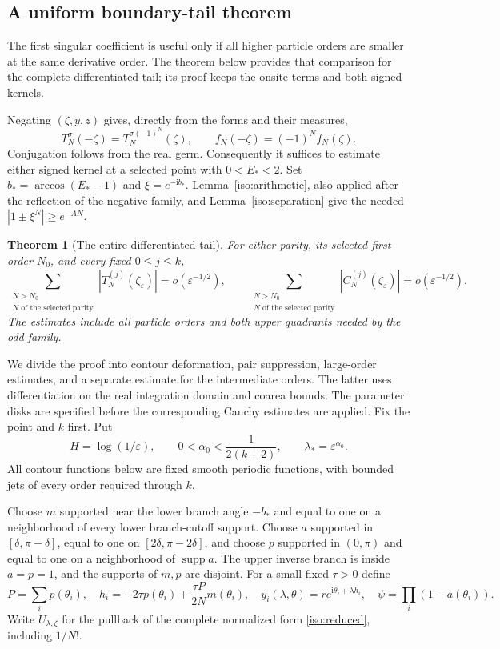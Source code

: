 \documentclass[11pt]{article}
\numberwithin{equation}{section}
\newtheorem{theorem}{Theorem}[section]
\theoremstyle{definition}
\newcommand{\ii}{\mathrm i}
\newcommand{\eps}{\varepsilon}
\begin{document}
\subsection{A uniform boundary-tail theorem}

The first singular coefficient is useful only if all higher particle
orders are smaller at the same derivative order. The theorem below
provides that comparison for the complete differentiated tail; its
proof keeps the onsite terms and both signed kernels.

Negating $(\zeta,y,z)$ gives, directly from the forms and their measures,
\begin{equation}
 T_N^\sigma(-\zeta)=T_N^{\sigma(-1)^N}(\zeta),\qquad
 f_N(-\zeta)=(-1)^Nf_N(\zeta).
 \label{iso:sign}
\end{equation}
Conjugation follows from the real germ. Consequently it suffices to
estimate either signed kernel at a selected point with $0<E_*<2$.
Set $b_*=\arccos(E_*-1)$ and $\xi=e^{-\ii b_*}$.
Lemma~\ref{iso:arithmetic}, also applied after the reflection of the
negative family, and Lemma~\ref{iso:separation} give the needed
$|1\pm\xi^N|\ge e^{-AN}$.

\begin{theorem}[The entire differentiated tail]\label{iso:tail}
For either parity, its selected first order $N_0$, and every fixed
$0\le j\le k$,
\[
 \sum_{\substack{N>N_0\\N\text{ of the selected parity}}}
 |T_N^{(j)}(\zeta_\eps)|=o(\eps^{-1/2}),\qquad
 \sum_{\substack{N>N_0\\N\text{ of the selected parity}}}
 |C_N^{(j)}(\zeta_\eps)|=o(\eps^{-1/2}).
\]
The estimates include all particle orders and both upper quadrants
needed by the odd family.
\end{theorem}

We divide the proof into contour deformation, pair suppression,
large-order estimates, and a separate estimate for the intermediate
orders. The latter uses differentiation on the real integration
domain and coarea bounds. The parameter disks are specified before
the corresponding Cauchy estimates are applied.
Fix the point and $k$ first. Put
\[
 H=\log(1/\eps),\qquad 0<\alpha_0<\frac1{2(k+2)},\qquad
 \lambda_*=\eps^{\alpha_0}.
\]
All contour functions below are fixed smooth periodic functions, with
bounded jets of every order required through $k$.

Choose $m$ supported near the lower branch angle $-b_*$ and equal to one
on a neighborhood of every lower branch-cutoff support. Choose $a$
supported in $[\delta,\pi-\delta]$, equal to one on
$[2\delta,\pi-2\delta]$, and choose $p$ supported in $(0,\pi)$ and
equal to one on a neighborhood of $\operatorname{supp}a$.
The upper inverse branch is inside $a=p=1$, and the supports of $m,p$
are disjoint. For a small fixed $\tau>0$ define
\[
 P=\sum_i p(\theta_i),\quad
 h_i=-2\tau p(\theta_i)+\frac{\tau P}{2N}m(\theta_i),\quad
 y_i(\lambda,\theta)=r e^{\ii\theta_i+\lambda h_i},\quad
 \psi=\prod_i(1-a(\theta_i)).
\]
Write $U_{\lambda,\zeta}$ for the pullback of the complete normalized
form \eqref{iso:reduced}, including $1/N!$.
\end{document}
